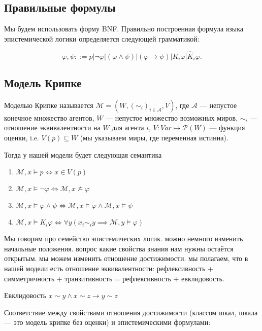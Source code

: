 \documentclass[openany]{book}
\theoremstyle{plain}
\theoremstyle{definition}
\begin{document}
\subsection{ Правильные формулы }

Мы будем использовать форму BNF. Правильно построенная формула языка эпистемической логики определяется следующей грамматикой:

\[\varphi, \psi ::= p | \neg \varphi | (\varphi \land \psi) | (\varphi \to \psi) | K_i\varphi | \hat{K}_i \varphi.\]

\subsection{ Модель Крипке }

Моделью Крипке называется \(\mathcal{M} = (W, (\sim_i)_{i\in \mathcal{A}}, V)\), где
\(\mathcal{A}\) — непустое конечное множество агентов, \(W\) — непустое множество возможных миров, \(\sim_i\) — отношение эквивалентности на \(W\) для агента \(i\), \(V : Var \mapsto \mathcal{P}(W)\) — функция оценки, i.e. \(V(p) \subseteq W\) (мы указываем миры, где переменная истинна).

Тогда у нашей модели будет следующая семантика
\begin{enumerate}
\item\(\mathcal{M}, x \models p \Leftrightarrow x \in V(p)\) 
\item\(\mathcal{M}, x \models \neg \varphi \Leftrightarrow \mathcal{M}, x \not\models \varphi\) 
\item\(\mathcal{M}, x \models \varphi \land \psi \Leftrightarrow \mathcal{M}, x \models \varphi \land \mathcal{M}, x \models \psi\)
\item\(\mathcal{M}, x \models K_i \varphi \Leftrightarrow \forall y(x_i \sim_i y \implies \mathcal{M}, y \models \varphi)\)
\end{enumerate}

Мы говорим про семейство эпистемических логик. можно немного изменить начальные положения.
вопрос какие свойства знания нам нужны остаётся открытым. мы можем изменить отношение достижимости. мы полагаем, что в нашей модели есть отношение эквивалентности: рефлексивность + симметричность + транзитивность = рефлексивность + евклидовость.

Евклидовость \(x \sim y \land x \sim z \to y \sim z\)

Соответствие между свойствами отношения достижимости (классом шкал, шкала — это модель крипке без оценки) и эпистемическими формулами:
\end{document}
